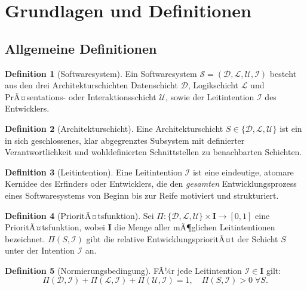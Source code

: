 ﻿\documentclass[a4paper,12pt]{article}
\theoremstyle{definition}
\newtheorem{definition}{Definition}
\begin{document}
\section{Grundlagen und Definitionen}

\subsection{Allgemeine Definitionen}

\begin{definition}[Softwaresystem]
Ein Softwaresystem $\mathcal{S} = (\mathcal{D}, \mathcal{L}, \mathcal{U},
\mathcal{I})$ besteht aus den drei Architekturschichten Datenschicht
$\mathcal{D}$, Logikschicht $\mathcal{L}$ und PrÃ¤sentations- oder
Interaktionsschicht $\mathcal{U}$, sowie der Leitintention $\mathcal{I}$
des Entwicklers.
\end{definition}

\begin{definition}[Architekturschicht]
Eine Architekturschicht $S \in \{\mathcal{D}, \mathcal{L}, \mathcal{U}\}$
ist ein in sich geschlossenes, klar abgegrenztes Subsystem mit definierter
Verantwortlichkeit und wohldefinierten Schnittstellen zu benachbarten Schichten.
\end{definition}

\begin{definition}[Leitintention]
Eine Leitintention $\mathcal{I}$ ist eine eindeutige, atomare Kernidee
des Erfinders oder Entwicklers, die den \emph{gesamten} Entwicklungsprozess
eines Softwaresystems von Beginn bis zur Reife motiviert und strukturiert.
\end{definition}

\begin{definition}[PrioritÃ¤tsfunktion]
Sei $\Pi: \{\mathcal{D}, \mathcal{L}, \mathcal{U}\} \times \mathbf{I}
\to [0,1]$ eine PrioritÃ¤tsfunktion, wobei $\mathbf{I}$ die Menge aller
mÃ¶glichen Leitintentionen bezeichnet. $\Pi(S, \mathcal{I})$ gibt die
relative EntwicklungsprioritÃ¤t der Schicht $S$ unter der Intention
$\mathcal{I}$ an.
\end{definition}

\begin{definition}[Normierungsbedingung]
FÃ¼r jede Leitintention $\mathcal{I} \in \mathbf{I}$ gilt:
\[
\Pi(\mathcal{D}, \mathcal{I}) + \Pi(\mathcal{L}, \mathcal{I}) +
\Pi(\mathcal{U}, \mathcal{I}) = 1, \quad
\Pi(S, \mathcal{I}) > 0 \;\forall S.
\]
\end{definition}
\end{document}
